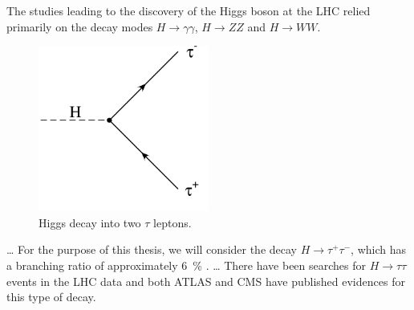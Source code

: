 The studies leading to the discovery of the Higgs boson at the LHC relied primarily on the decay modes $H \rightarrow \gamma \gamma$, $H \rightarrow ZZ$ and $H \rightarrow WW$.
%
\begin{figure}[]
	\includegraphics[width=0.5\textwidth]{images/h_tautau.pdf}
	\caption{Higgs decay into two $\tau$ leptons.}
	\label{fig:gluonfusion}
\end{figure}
%

\ldots
For the purpose of this thesis, we will consider the decay $H \rightarrow \tau^+ \tau^-$, which has a branching ratio of approximately \SI{6}{\percent} \cite{higgshandbook3}.
\ldots
There have been searches for $H \rightarrow \tau \tau$ events in the LHC data and both ATLAS \cite{htau_atlas} and CMS \cite{htau_cms} have published evidences for this type of decay.
